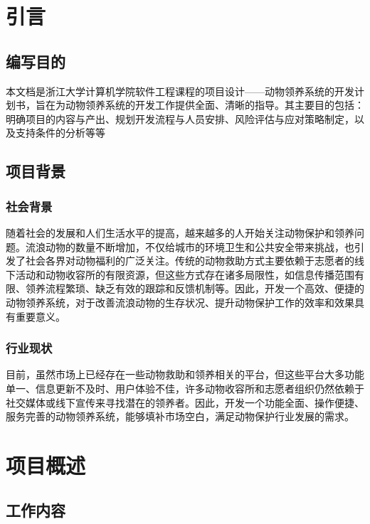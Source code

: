 \documentclass[12pt,a4paper,UTF8]{article}
\begin{document}

\maketoc    %

\section{引言} 

\subsection{编写目的}

本文档是浙江大学计算机学院软件工程课程的项目设计——动物领养系统的开发计划书，旨在为动物领养系统的开发工作提供全面、清晰的指导。其主要目的包括：明确项目的内容与产出、规划开发流程与人员安排、风险评估与应对策略制定，以及支持条件的分析等等

\subsection{项目背景}

\subsubsection{社会背景}
随着社会的发展和人们生活水平的提高，越来越多的人开始关注动物保护和领养问题。流浪动物的数量不断增加，不仅给城市的环境卫生和公共安全带来挑战，也引发了社会各界对动物福利的广泛关注。传统的动物救助方式主要依赖于志愿者的线下活动和动物收容所的有限资源，但这些方式存在诸多局限性，如信息传播范围有限、领养流程繁琐、缺乏有效的跟踪和反馈机制等。因此，开发一个高效、便捷的动物领养系统，对于改善流浪动物的生存状况、提升动物保护工作的效率和效果具有重要意义。

\subsubsection{行业现状}
目前，虽然市场上已经存在一些动物救助和领养相关的平台，但这些平台大多功能单一、信息更新不及时、用户体验不佳，许多动物收容所和志愿者组织仍然依赖于社交媒体或线下宣传来寻找潜在的领养者。因此，开发一个功能全面、操作便捷、服务完善的动物领养系统，能够填补市场空白，满足动物保护行业发展的需求。

\section{项目概述}

\subsection{工作内容}
\end{document}
